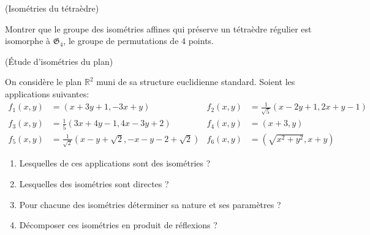 \documentclass[a4paper,12pt,reqno]{amsart}
\begin{document}
\begin{exo} (Isométries du tétraèdre)

    Montrer que le groupe des isométries affines qui préserve un tétraèdre régulier est isomorphe à $\mathfrak{G}_{4}$, le groupe de permutations de $4$ points.
\end{exo}

\begin{exo} (Étude d'isométries du plan)

  On considère le plan $\mathbb{R}^{2}$ muni de sa structure euclidienne standard. Soient les applications suivantes:
  \begin{align*}
  f_{1}(x,y) &= (x+3y+1,-3x+y) & f_{2}(x,y) &= \frac{1}{\sqrt{5}}(x-2y+1,2x+y-1)\\
  f_{3}(x,y) &= \frac{1}{5}(3x+4y-1,4x-3y+2) & f_{4}(x,y) &= (x+3,y)\\
  f_{5}(x,y) &= \frac{1}{\sqrt{2}}(x-y+\sqrt{2},-x-y-2+\sqrt{2}) & f_{6}(x,y) &= (\sqrt{x^{2}+y^{2}},x+y)
  \end{align*}
  \begin{enumerate}
    \item Lesquelles de ces applications sont des isométries ?
    \item Lesquelles des isométries sont directes ?
    \item Pour chacune des isométries déterminer sa nature et ses paramètres ?
    \item Décomposer ces isométries en produit de réflexions ?
  \end{enumerate}
\end{exo}
\end{document}
